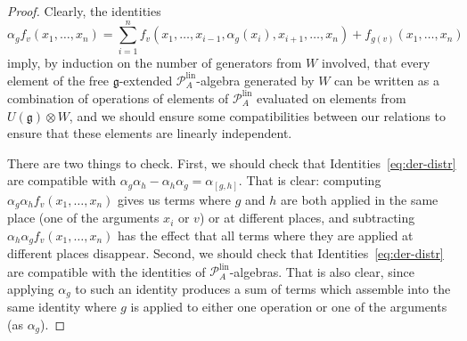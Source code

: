 \documentclass[AHL,Unicode,longabstracts]{cedram}
\newcommand{\cP}{\mathcal{P}}
\newcommand*\fkg{\mathfrak{g}}
\newcommand{\linn}{\mathrm{lin}}
\begin{document}
\begin{proof}
Clearly, the identities
\begin{equation}\label{eq:der-distr}
\alpha_g f_v(x_1,\dots,x_n)=\sum_{i=1}^n f_v(x_1,\dots,x_{i-1},\alpha_g(x_i),x_{i+1},\dots,x_n)+f_{g(v)}(x_1,\dots,x_n)
\end{equation}
imply, by induction on the number of generators from $W$ involved, that every element of the free $\fkg$-extended $\cP_A^{\linn}$-algebra generated by $W$ can be written as a combination of operations of elements of $\cP_A^{\linn}$ evaluated on elements from $U(\fkg)\otimes W$, and we should ensure some compatibilities between our relations to ensure that these elements are linearly independent.

There are two things to check. First, we should check that Identities~\eqref{eq:der-distr} are compatible with $\alpha_g\alpha_h-\alpha_h\alpha_g=\alpha_{[g,h]}$. That is clear: computing $\alpha_g\alpha_h f_v(x_1,\dots,x_n)$ gives us terms where $g$ and $h$ are both applied in the same place (one of the arguments $x_i$ or $v$) or at different places, and subtracting $\alpha_h\alpha_g f_v(x_1,\dots,x_n)$ has the effect that all terms where they are applied at different places disappear. Second, we should check that Identities~\eqref{eq:der-distr} are compatible with the identities of $\cP_A^{\linn}$-algebras. That is also clear, since applying $\alpha_g$ to such an identity produces a sum of terms which assemble into the same identity where $g$ is applied to either one operation or one of the arguments (as $\alpha_g$).
\end{proof}
\end{document}

